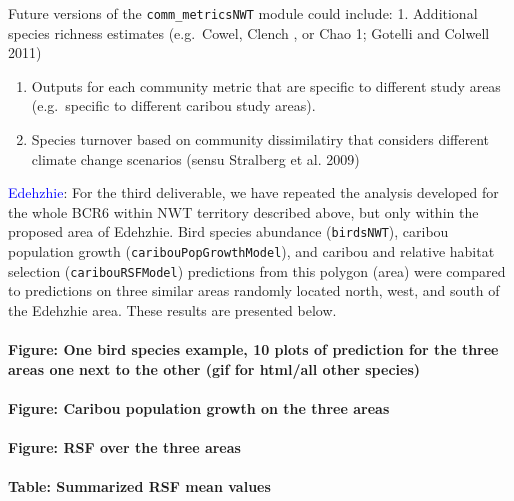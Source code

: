 \documentclass[]{article}
\let\oldparagraph\paragraph
\renewcommand{\paragraph}[1]{\oldparagraph{#1}\mbox{}}
\begin{document}
Future versions of the \texttt{comm\_metricsNWT} module could include:
1. Additional species richness estimates (e.g.~Cowel, Clench , or Chao
1; Gotelli and Colwell 2011)

\begin{enumerate}
\def\labelenumi{\arabic{enumi}.}
\setcounter{enumi}{1}
\item
  Outputs for each community metric that are specific to different study
  areas (e.g.~specific to different caribou study areas).
\item
  Species turnover based on community dissimilatiry that considers
  different climate change scenarios (sensu Stralberg et al. 2009)
\end{enumerate}

\textcolor{blue}{Edehzhie}: For the third deliverable, we have repeated
the analysis developed for the whole BCR6 within NWT territory described
above, but only within the proposed area of Edehzhie. Bird species
abundance (\texttt{birdsNWT}), caribou population growth
(\texttt{caribouPopGrowthModel}), and caribou and relative habitat
selection (\texttt{caribouRSFModel}) predictions from this polygon
(area) were compared to predictions on three similar areas randomly
located north, west, and south of the Edehzhie area. These results are
presented below.

\paragraph{Figure: One bird species example, 10 plots of prediction for
the three areas one next to the other (gif for html/all other
species)}\label{figure-one-bird-species-example-10-plots-of-prediction-for-the-three-areas-one-next-to-the-other-gif-for-htmlall-other-species}

\paragraph{Figure: Caribou population growth on the three
areas}\label{figure-caribou-population-growth-on-the-three-areas}

\paragraph{Figure: RSF over the three
areas}\label{figure-rsf-over-the-three-areas}

\paragraph{Table: Summarized RSF mean
values}\label{table-summarized-rsf-mean-values}
\end{document}
